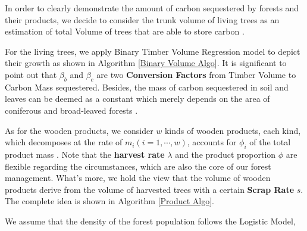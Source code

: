 \documentclass{mcmthesis}
\numberwithin{figure}{section}
\numberwithin{table}{section}
\numberwithin{equation}{section}
\begin{document}
In order to clearly demonstrate the amount of carbon sequestered by forests and their
products, we decide to consider the trunk volume of living trees as an estimation of 
total Volume of trees that are able to store carbon \citep{WangYan}. 
\par
For the living trees, we apply Binary Timber Volume Regression model \citep{LuoQingbang} 
to depict their growth as shown in Algorithm \ref{Binary Volume Algo}. 
It is significant
to point out that $ \beta_b $ and $ \beta_c $ are two \textbf{Conversion Factors} from
Timber Volume to Carbon Mass sequestered. Besides, the mass of carbon sequestered in
soil and leaves can be deemed as a constant which merely depends on the area
of coniferous and broad-leaved forests \citep{YanDeren2011}. 
\par
As for the wooden products, we consider $ w $ kinds of wooden products, each kind,
which decomposes at the rate of $ m_i (i = 1,\cdots, w) $, accounts for $ \phi_i$ 
of the total product mass \citep{2006Forest}. Note that the \textbf{harvest rate} $ \lambda $ and the product
proportion $ \phi $ are flexible regarding the circumstances, which are also 
the core of our forest management. What's more, we hold the view that 
the volume of wooden products derive from the volume of harvested trees with a certain
\textbf{Scrap Rate} $ s $. The complete idea is shown in Algorithm \ref{Product Algo}.
\par
We assume that the density of the forest population follows the Logistic Model, 
\end{document}
